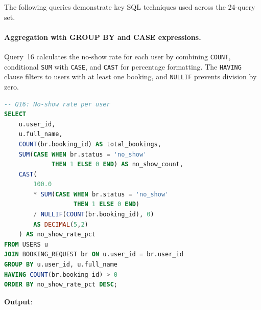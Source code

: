 The following queries demonstrate key SQL techniques used across the 24-query set.

\paragraph{Aggregation with GROUP BY and CASE expressions.}
Query~16 calculates the no-show rate for each user by combining \texttt{COUNT}, conditional \texttt{SUM} with \texttt{CASE}, and \texttt{CAST} for percentage formatting. The \texttt{HAVING} clause filters to users with at least one booking, and \texttt{NULLIF} prevents division by zero.

\begin{lstlisting}[language=SQL]
-- Q16: No-show rate per user
SELECT
    u.user_id,
    u.full_name,
    COUNT(br.booking_id) AS total_bookings,
    SUM(CASE WHEN br.status = 'no_show'
             THEN 1 ELSE 0 END) AS no_show_count,
    CAST(
        100.0
        * SUM(CASE WHEN br.status = 'no_show'
                   THEN 1 ELSE 0 END)
        / NULLIF(COUNT(br.booking_id), 0)
        AS DECIMAL(5,2)
    ) AS no_show_rate_pct
FROM USERS u
JOIN BOOKING_REQUEST br ON u.user_id = br.user_id
GROUP BY u.user_id, u.full_name
HAVING COUNT(br.booking_id) > 0
ORDER BY no_show_rate_pct DESC;
\end{lstlisting}
\textbf{Output}:
\begin{table}[htbp]
\centering
{}
\end{table}
